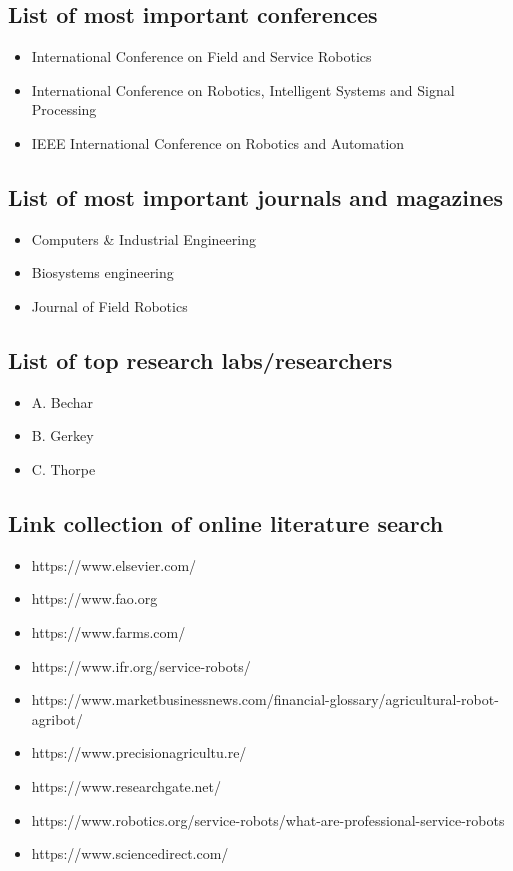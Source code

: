     \subsection{List of most important conferences}
    \begin{itemize}
        \item International Conference on Field and Service Robotics
        \item International Conference on Robotics, Intelligent Systems and Signal Processing
        \item IEEE International Conference on Robotics and Automation
    \end{itemize}
    \subsection{List of most important journals and magazines}
    \begin{itemize}
        \item Computers {\&} Industrial Engineering
        \item Biosystems engineering
        \item Journal of Field Robotics
    \end{itemize}
    \subsection{List of top research labs/researchers}
    \begin{itemize}
        \item A. Bechar 
        \item B. Gerkey
        \item C. Thorpe 
    \end{itemize}
    \subsection{Link collection of online literature search}
    \begin{itemize}
        \item https://www.elsevier.com/
        \item https://www.fao.org
        \item https://www.farms.com/
        \item https://www.ifr.org/service-robots/
        \item https://www.marketbusinessnews.com/financial-glossary/agricultural-robot-agribot/
        \item https://www.precisionagricultu.re/
        \item https://www.researchgate.net/
        \item https://www.robotics.org/service-robots/what-are-professional-service-robots
        \item https://www.sciencedirect.com/
    \end{itemize}
